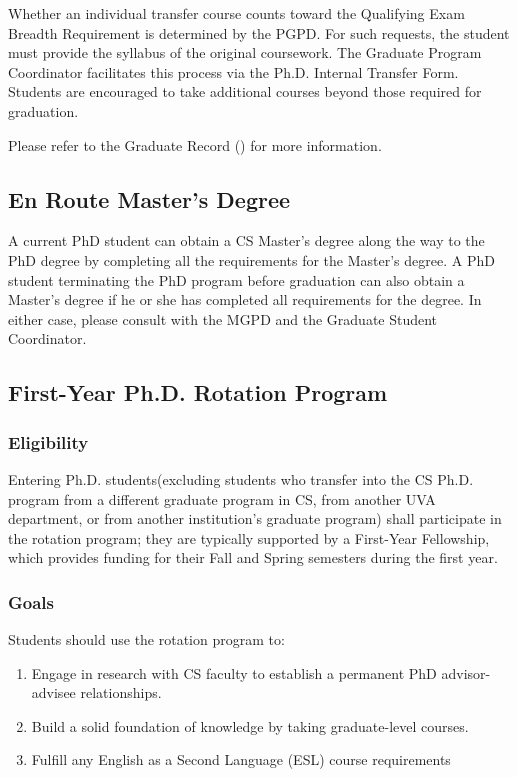 Whether an individual transfer course counts toward the Qualifying Exam Breadth
Requirement is determined by the PGPD. For such requests, the student must
provide the syllabus of the original coursework. The Graduate Program
Coordinator facilitates this process via the Ph.D. Internal Transfer Form.
Students are encouraged to take additional courses beyond those required for
graduation.

Please refer to the Graduate Record () for more information.


\hypertarget{en-route-masters-degree}{
\subsection{En Route Master's Degree}
\label{en-route-masters-degree}
}

A current PhD student can obtain a CS Master's degree along the way to
the PhD degree by completing all the requirements for the Master's
degree. A PhD student terminating the PhD program before graduation can
also obtain a Master's degree if he or she has completed all
requirements for the degree. In either case, please consult with the MGPD and the Graduate Student Coordinator.





\hypertarget{first-year-phd-rotation-program}{
\subsection{First-Year Ph.D. Rotation Program}
\label{first-year-phd-rotation-program}
}

\subsubsection{Eligibility}

Entering Ph.D. students(excluding students who transfer into the CS Ph.D.
program from a different graduate program in CS, from another UVA department,
or from another institution's graduate program) shall participate in the
rotation program; they are typically supported by a First-Year Fellowship,
which provides funding for their Fall and Spring semesters during the first
year.

\subsubsection{Goals}

Students should use the rotation program to:
\begin{enumerate}[nosep]
  \item Engage in research with CS faculty to establish a permanent PhD advisor-advisee relationships.
  \item Build a solid foundation of knowledge by taking graduate-level courses.
  \item Fulfill any English as a Second Language (ESL) course requirements
\end{enumerate}

